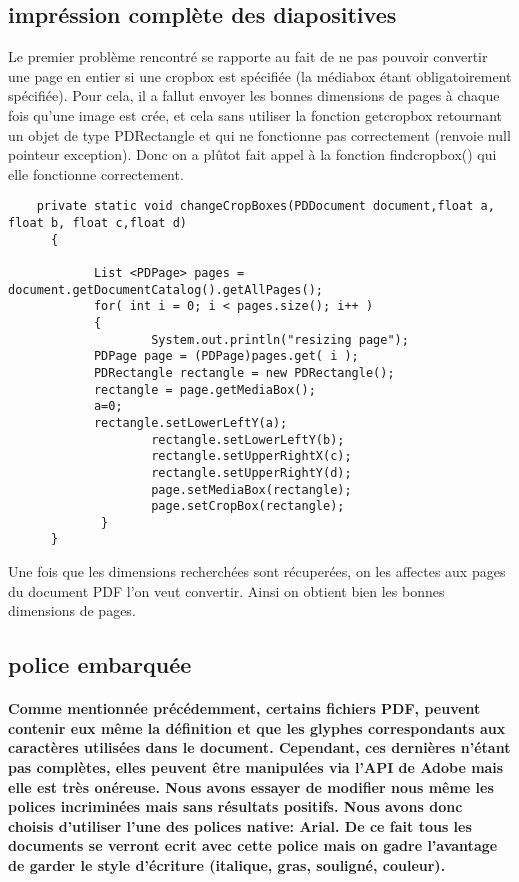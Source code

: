 	\subsection{impréssion complète des diapositives}
		 Le premier problème rencontré se rapporte au fait de ne pas pouvoir convertir une page en entier si une cropbox est spécifiée (la médiabox étant obligatoirement spécifiée). Pour cela, il a fallut envoyer les bonnes dimensions de pages à chaque fois qu'une image est crée, et cela sans utiliser la fonction
		 getcropbox retournant un objet de type PDRectangle et qui ne fonctionne pas correctement (renvoie null pointeur exception). Donc on a plûtot fait appel à la fonction findcropbox() qui elle fonctionne correctement.
	\begin{lstlisting} 
	private static void changeCropBoxes(PDDocument document,float a, float b, float c,float d)
  	  {

      		List <PDPage> pages = document.getDocumentCatalog().getAllPages();
      		for( int i = 0; i < pages.size(); i++ )
      		{
          			System.out.println("resizing page");
	  		PDPage page = (PDPage)pages.get( i );
	  		PDRectangle rectangle = new PDRectangle();
	   		rectangle = page.getMediaBox();
	   		a=0;
	   		rectangle.setLowerLeftY(a);
             		rectangle.setLowerLeftY(b);
              		rectangle.setUpperRightX(c);
             		rectangle.setUpperRightY(d);
             		page.setMediaBox(rectangle);
             		page.setCropBox(rectangle);
     		 }
  	  }
 \end{lstlisting}

	Une fois que les dimensions recherchées sont récuperées, on les affectes aux pages du document PDF l'on veut convertir. Ainsi on obtient bien les bonnes dimensions de pages.
		\subsection{police embarquée}
	\paragraph{
	Comme mentionnée précédemment, certains fichiers PDF, peuvent contenir eux même la définition et que les glyphes correspondants aux caractères utilisées dans le document. \newline Cependant, ces dernières n'étant pas complètes, elles peuvent être manipulées via l'API de Adobe mais elle est très onéreuse. 				Nous avons essayer de modifier nous même les polices incriminées mais sans résultats positifs. Nous avons donc choisis d'utiliser l'une des polices native: Arial. \newline
	De ce fait tous les documents  se verront ecrit avec cette police mais on gadre l'avantage de garder le style d'écriture (italique, gras, souligné, couleur).
	}








